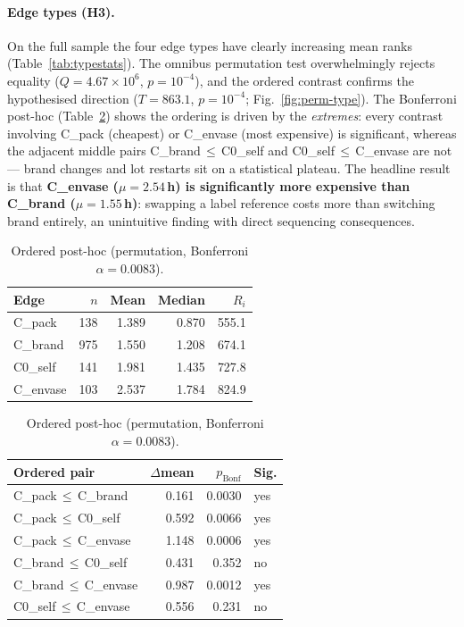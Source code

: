 \documentclass[11pt,a4paper]{article}
\begin{document}
\paragraph{Edge types (H3).}
On the full sample the four edge types have clearly increasing mean ranks
(Table~\ref{tab:typestats}). The omnibus permutation test overwhelmingly rejects
equality ($Q=4.67\times10^{6}$, $p=10^{-4}$), and the ordered contrast confirms
the hypothesised direction ($T=863.1$, $p=10^{-4}$; Fig.~\ref{fig:perm-type}). The
Bonferroni post-hoc (Table~\ref{tab:posthoc}) shows the ordering is driven by the
\emph{extremes}: every contrast involving C\_pack (cheapest) or C\_envase (most
expensive) is significant, whereas the adjacent middle pairs
C\_brand\,$\le$\,C0\_self and C0\_self\,$\le$\,C\_envase are not --- brand changes
and lot restarts sit on a statistical plateau. The headline result is that
\textbf{C\_envase ($\mu=2.54$\,h) is significantly more expensive than C\_brand
($\mu=1.55$\,h)}: swapping a label reference costs more than switching brand
entirely, an unintuitive finding with direct sequencing consequences.

\begin{table}[H]\centering\small
\begin{minipage}[t]{0.44\textwidth}\centering
\begin{tabular}{@{}lrrrr@{}}
\toprule
Edge & $n$ & Mean & Median & $R_i$ \\
\midrule
C\_pack   & 138 & 1.389 & 0.870 & 555.1 \\
C\_brand  & 975 & 1.550 & 1.208 & 674.1 \\
C0\_self  & 141 & 1.981 & 1.435 & 727.8 \\
C\_envase & 103 & 2.537 & 1.784 & 824.9 \\
\bottomrule
\end{tabular}
\caption{Duration statistics and mean ranks by edge type.}
\label{tab:typestats}
\end{minipage}\hfill
\begin{minipage}[t]{0.52\textwidth}\centering
\begin{tabular}{@{}lrrl@{}}
\toprule
Ordered pair & $\Delta$mean & $p_{\text{Bonf}}$ & Sig.\\
\midrule
C\_pack\,$\le$\,C\_brand   & 0.161 & 0.0030 & yes \\
C\_pack\,$\le$\,C0\_self   & 0.592 & 0.0066 & yes \\
C\_pack\,$\le$\,C\_envase  & 1.148 & 0.0006 & yes \\
C\_brand\,$\le$\,C0\_self  & 0.431 & 0.352  & no  \\
C\_brand\,$\le$\,C\_envase & 0.987 & 0.0012 & yes \\
C0\_self\,$\le$\,C\_envase & 0.556 & 0.231  & no  \\
\bottomrule
\end{tabular}
\caption{Ordered post-hoc (permutation, Bonferroni $\alpha=0.0083$).}
\label{tab:posthoc}
\end{minipage}
\end{table}
\end{document}
